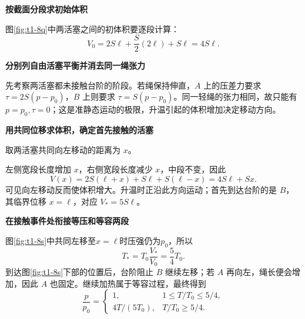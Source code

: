 \begin{solution}\textbf{按截面分段求初始体积}\par\nobreak
图\ref{fig:t1-8q}中两活塞之间的初体积要逐段计算：
\[V_0=2S\ell+\frac S2(2\ell)+S\ell=4S\ell.\]


\par\medskip{}\noindent\textbf{分别列自由活塞平衡并消去同一绳张力}\par\nobreak
先考察两活塞都未接触台阶的阶段。若绳保持伸直，$A$ 上的压差力要求 $\tau=2S(p-p_0)$，$B$ 上则要求 $\tau=S(p-p_0)$。同一轻绳的张力相同，故只能有 $p=p_0,\tau=0$；这是准静态运动的极限，升温引起的体积增加决定移动方向。


\par\medskip{}\noindent\textbf{用共同位移求体积，确定首先接触的活塞}\par\nobreak
取两活塞共同向左移动的距离为 $x$。

左侧宽段长度增加 $x$，右侧宽段长度减少 $x$，中段不变，因此
\[V(x)=2S(\ell+x)+S\ell+S(\ell-x)=4S\ell+Sx.\]
可见向左移动反而使体积增大。升温时正沿此方向运动；首先到达台阶的是 $B$，其临界位移 $x=\ell$，对应 $V_*=5S\ell$。



\par\medskip{}\noindent\textbf{在接触事件处衔接等压和等容两段}\par\nobreak
图\ref{fig:t1-8s}中共同左移至$x=\ell$时压强仍为$p_0$，所以
\[T_*=T_0\frac{V_*}{V_0}=\frac54T_0.\]
到达图\ref{fig:t1-8s}下部的位置后，台阶阻止 $B$ 继续左移；若 $A$ 再向左，绳长便会增加，因此 $A$ 也固定。继续加热属于等容过程，最终得到
\[\boxed{\frac p{p_0}=\begin{cases}1,&1\le T/T_0\le5/4,\\[1mm]4T/(5T_0),&T/T_0\ge5/4.\end{cases}}\]
\end{solution}
